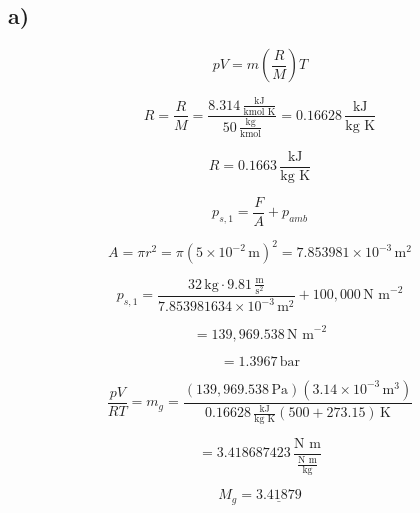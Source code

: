 

\subsection*{a)}

\[
pV = m \left( \frac{R}{M} \right) T
\]

\[
R = \frac{R}{M} = \frac{8.314 \, \frac{\text{kJ}}{\text{kmol K}}}{50 \, \frac{\text{kg}}{\text{kmol}}} = 0.16628 \, \frac{\text{kJ}}{\text{kg K}}
\]

\[
R = 0.1663 \, \frac{\text{kJ}}{\text{kg K}}
\]

\[
p_{s,1} = \frac{F}{A} + p_{amb}
\]

\[
A = \pi r^2 = \pi (5 \times 10^{-2} \, \text{m})^2 = 7.853981 \times 10^{-3} \, \text{m}^2
\]

\[
p_{s,1} = \frac{32 \, \text{kg} \cdot 9.81 \, \frac{\text{m}}{\text{s}^2}}{7.853981634 \times 10^{-3} \, \text{m}^2} + 100,000 \, \text{N m}^{-2}
\]

\[
= 139,969.538 \, \text{N m}^{-2}
\]

\[
= 1.3967 \, \text{bar}
\]

\[
\frac{pV}{RT} = m_g = \frac{(139,969.538 \, \text{Pa}) (3.14 \times 10^{-3} \, \text{m}^3)}{0.16628 \, \frac{\text{kJ}}{\text{kg K}} (500 + 273.15) \, \text{K}}
\]

\[
= 3.418687423 \, \frac{\text{N m}}{\frac{\text{N m}}{\text{kg}}}
\]

\[
M_g = \underline{3.41879}
\]